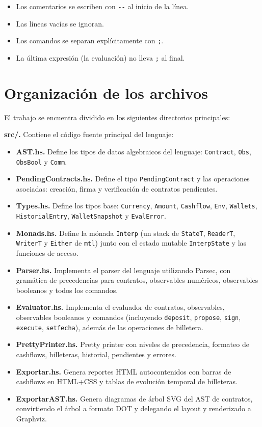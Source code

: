 \documentclass[a4paper, 12pt]{article}
\begin{document}
\begin{itemize}[nosep]
    \item Los comentarios se escriben con \texttt{-{}-} al inicio de la línea.
    \item Las líneas vacías se ignoran.
    \item Los comandos se separan explícitamente con \texttt{;}.
    \item La última expresión (la evaluación) no lleva \texttt{;} al final.
\end{itemize}

\section{Organización de los archivos}

El trabajo se encuentra dividido en los siguientes directorios principales:

\textbf{src/.} Contiene el código fuente principal del lenguaje:
\begin{itemize}[nosep]
    \item \textbf{AST.hs.} Define los tipos de datos algebraicos del lenguaje: \texttt{Contract}, \texttt{Obs}, \texttt{ObsBool} y \texttt{Comm}.
    \item \textbf{PendingContracts.hs.} Define el tipo \texttt{PendingContract} y las operaciones asociadas: creación, firma y verificación de contratos pendientes.
    \item \textbf{Types.hs.} Define los tipos base: \texttt{Currency}, \texttt{Amount}, \texttt{Cashflow}, \texttt{Env}, \texttt{Wallets}, \texttt{HistorialEntry}, \texttt{WalletSnapshot} y \texttt{EvalError}.
    \item \textbf{Monads.hs.} Define la mónada \texttt{Interp} (un stack de \texttt{StateT}, \texttt{ReaderT}, \texttt{WriterT} y \texttt{Either} de \texttt{mtl}) junto con el estado mutable \texttt{InterpState} y las funciones de acceso.
    \item \textbf{Parser.hs.} Implementa el parser del lenguaje utilizando Parsec, con gramática de precedencias para contratos, observables numéricos, observables booleanos y todos los comandos.
    \item \textbf{Evaluator.hs.} Implementa el evaluador de contratos, observables, observables booleanos y comandos (incluyendo \texttt{deposit}, \texttt{propose}, \texttt{sign}, \texttt{execute}, \texttt{setfecha}), además de las operaciones de billetera.
    \item \textbf{PrettyPrinter.hs.} Pretty printer con niveles de precedencia, formateo de cashflows, billeteras, historial, pendientes y errores.
    \item \textbf{Exportar.hs.} Genera reportes HTML autocontenidos con barras de cashflows en HTML+CSS y tablas de evolución temporal de billeteras.
    \item \textbf{ExportarAST.hs.} Genera diagramas de árbol SVG del AST de contratos, convirtiendo el árbol a formato DOT y delegando el layout y renderizado a Graphviz\cite{graphviz}.
\end{itemize}
\end{document}

